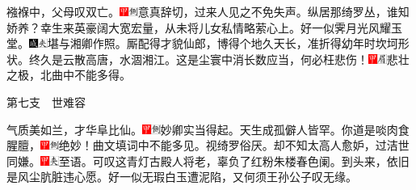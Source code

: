 襁褓中，父母叹双亡。{\includegraphics[width=3mm]{../Images/00002}\includegraphics[width=3mm]{../Images/00011}\footnotesize \kaishu 意真辞切，过来人见之不免失声。}纵居那绮罗丛，谁知娇养？幸生来英豪阔大宽宏量，从未将儿女私情略萦心上。好一似霁月光风耀玉堂。{\includegraphics[width=3mm]{../Images/00005}\includegraphics[width=3mm]{../Images/00012}\footnotesize \kaishu 堪与湘卿作照。}厮配得才貌仙郎，博得个地久天长，准折得幼年时坎坷形状。终久是云散高唐，水涸湘江。这是尘寰中消长数应当，何必枉悲伤！{\includegraphics[width=3mm]{../Images/00002}\includegraphics[width=3mm]{../Images/00010}\footnotesize \kaishu 悲壮之极，北曲中不能多得。}

第七支　世难容

气质美如兰，才华阜比仙。{\includegraphics[width=3mm]{../Images/00002}\includegraphics[width=3mm]{../Images/00011}\footnotesize \kaishu 妙卿实当得起。}天生成孤僻人皆罕。你道是啖肉食腥膻，{\includegraphics[width=3mm]{../Images/00002}\includegraphics[width=3mm]{../Images/00011}\footnotesize \kaishu 绝妙！曲文填词中不能多见。}视绮罗俗厌。却不知太高人愈妒，过洁世同嫌。{\includegraphics[width=3mm]{../Images/00002}\includegraphics[width=3mm]{../Images/00012}\footnotesize \kaishu 至语。}可叹这青灯古殿人将老，辜负了红粉朱楼春色阑。到头来，依旧是风尘肮脏违心愿。好一似无瑕白玉遭泥陷，又何须王孙公子叹无缘。


